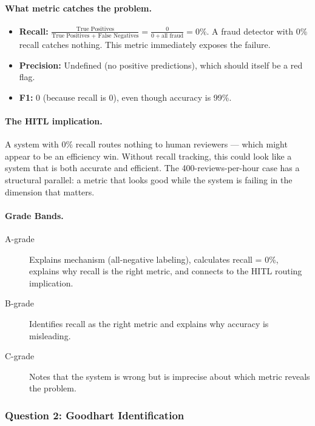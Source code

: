 \paragraph{What metric catches the problem.}

\begin{itemize}
    \item \textbf{Recall:} $\frac{\text{True Positives}}{\text{True Positives + False Negatives}} = \frac{0}{0 + \text{all fraud}} = 0\%$. A fraud detector with 0\% recall catches nothing. This metric immediately exposes the failure.
    \item \textbf{Precision:} Undefined (no positive predictions), which should itself be a red flag.
    \item \textbf{F1:} 0 (because recall is 0), even though accuracy is 99\%.
\end{itemize}

\paragraph{The HITL implication.}

A system with 0\% recall routes nothing to human reviewers --- which might appear to be an efficiency win. Without recall tracking, this could look like a system that is both accurate and efficient. The 400-reviews-per-hour case has a structural parallel: a metric that looks good while the system is failing in the dimension that matters.

\paragraph{Grade Bands.}

\begin{description}
    \item[A-grade] Explains mechanism (all-negative labeling), calculates recall = 0\%, explains why recall is the right metric, and connects to the HITL routing implication.
    \item[B-grade] Identifies recall as the right metric and explains why accuracy is misleading.
    \item[C-grade] Notes that the system is wrong but is imprecise about which metric reveals the problem.
\end{description}

\subsubsection{Question 2: Goodhart Identification}

